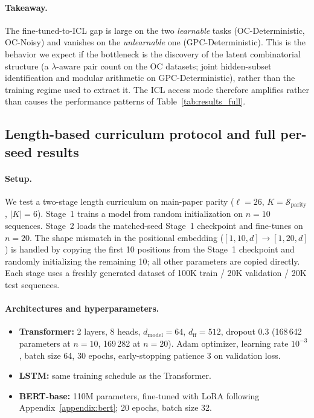 \documentclass{article}
\theoremstyle{plain}
\theoremstyle{definition}
\theoremstyle{remark}
\begin{document}
\paragraph{Takeaway.}
The fine-tuned-to-ICL gap is large on the two \emph{learnable} tasks (OC-Deterministic, OC-Noisy) and vanishes on the \emph{unlearnable} one (GPC-Deterministic). This is the behavior we expect if the bottleneck is the discovery of the latent combinatorial structure (a $\lambda$-aware pair count on the OC datasets; joint hidden-subset identification and modular arithmetic on GPC-Deterministic), rather than the training regime used to extract it. The ICL access mode therefore amplifies rather than causes the performance patterns of Table~\ref{tab:results_full}.

\subsection{Length-based curriculum protocol and full per-seed results}
\label{app:parity_curriculum}

\paragraph{Setup.} We test a two-stage length curriculum on main-paper parity ($\ell=26$, $K=\mathcal{S}_{\text{parity}}$, $|K|=6$). Stage~1 trains a model from random initialization on $n=10$ sequences. Stage~2 loads the matched-seed Stage~1 checkpoint and fine-tunes on $n=20$. The shape mismatch in the positional embedding ($[1, 10, d] \to [1, 20, d]$) is handled by copying the first 10 positions from the Stage~1 checkpoint and randomly initializing the remaining 10; all other parameters are copied directly. Each stage uses a freshly generated dataset of 100K train / 20K validation / 20K test sequences.

\paragraph{Architectures and hyperparameters.}
\begin{itemize}
\item \textbf{Transformer:} 2 layers, 8 heads, $d_{\text{model}}=64$, $d_{\text{ff}}=512$, dropout 0.3 (168\,642 parameters at $n=10$, 169\,282 at $n=20$). Adam optimizer, learning rate $10^{-3}$, batch size 64, 30 epochs, early-stopping patience 3 on validation loss.
\item \textbf{LSTM:} same training schedule as the Transformer.
\item \textbf{BERT-base:} 110M parameters, fine-tuned with LoRA following Appendix~\ref{appendix:bert}; 20 epochs, batch size 32.
\end{itemize}
\end{document}
